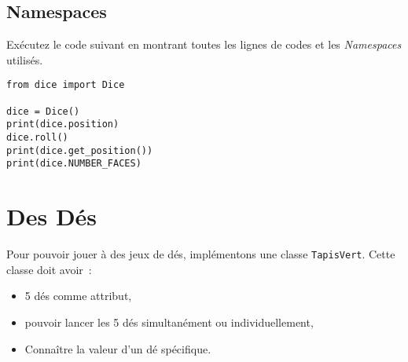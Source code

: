 \documentclass[12pt]{article}
\begin{document}
\subsection{Namespaces}

Exécutez le code suivant en montrant toutes les lignes de codes et les {\em Namespaces} utilisés.

\lstset{language=Python}
\begin{lstlisting}
from dice import Dice

dice = Dice()
print(dice.position)
dice.roll()
print(dice.get_position())
print(dice.NUMBER_FACES)
\end{lstlisting}

\section{Des Dés}

Pour pouvoir jouer à des jeux de dés, implémentons une classe \verb|TapisVert|. Cette classe doit avoir~:
\begin{itemize}
	\item 5 dés comme attribut,
	\item pouvoir lancer les 5 dés simultanément ou individuellement,
	\item Connaître la valeur d'un dé spécifique.
\end{itemize}
\end{document}

